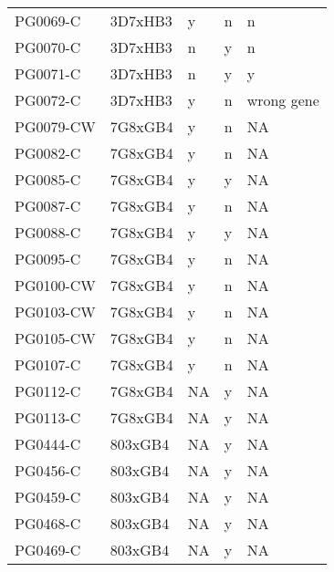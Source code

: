 \begin{table}[]
\begin{tabular}{@{}lllll@{}}
PG0069-C  & 3D7xHB3 & y                         & n                    & n                        \\
PG0070-C  & 3D7xHB3 & n                         & y                    & n                        \\
PG0071-C  & 3D7xHB3 & n                         & y                    & y                        \\
PG0072-C  & 3D7xHB3 & y                         & n                    & wrong gene               \\
PG0079-CW & 7G8xGB4 & y                         & n                    & NA                       \\
PG0082-C  & 7G8xGB4 & y                         & n                    & NA                       \\
PG0085-C  & 7G8xGB4 & y                         & y                    & NA                       \\
PG0087-C  & 7G8xGB4 & y                         & n                    & NA                       \\
PG0088-C  & 7G8xGB4 & y                         & y                    & NA                       \\
PG0095-C  & 7G8xGB4 & y                         & n                    & NA                       \\
PG0100-CW & 7G8xGB4 & y                         & n                    & NA                       \\
PG0103-CW & 7G8xGB4 & y                         & n                    & NA                       \\
PG0105-CW & 7G8xGB4 & y                         & n                    & NA                       \\
PG0107-C  & 7G8xGB4 & y                         & n                    & NA                       \\
PG0112-C  & 7G8xGB4 & NA                        & y                    & NA                       \\
PG0113-C  & 7G8xGB4 & NA                        & y                    & NA                       \\
PG0444-C  & 803xGB4 & NA                        & y                    & NA                       \\
PG0456-C  & 803xGB4 & NA                        & y                    & NA                       \\
PG0459-C  & 803xGB4 & NA                        & y                    & NA                       \\
PG0468-C  & 803xGB4 & NA                        & y                    & NA                       \\
PG0469-C  & 803xGB4 & NA                        & y                    & NA                       \\ \bottomrule
\end{tabular}
\end{table}

